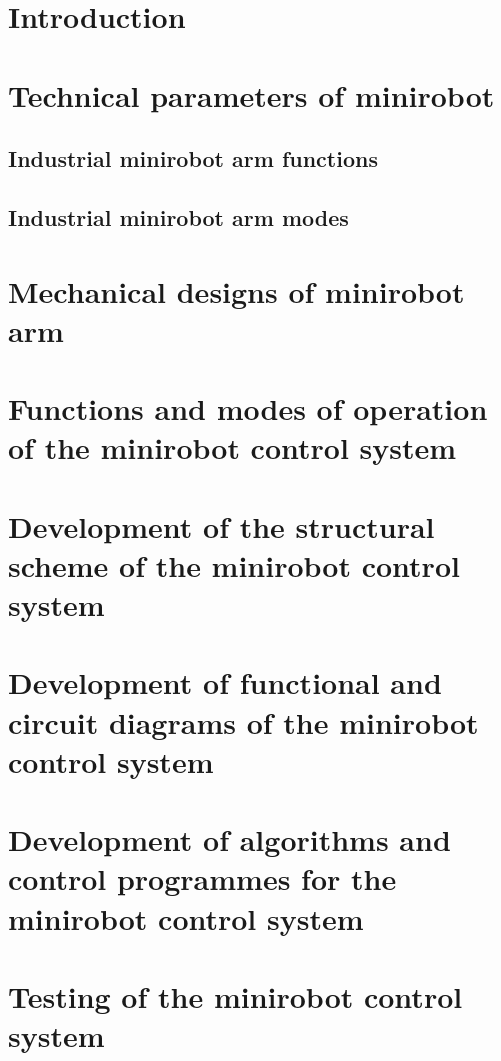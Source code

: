 
\section*{Introduction}



\section{Technical parameters of minirobot}

\subsection{Industrial minirobot arm functions}
\subsection{Industrial minirobot arm modes}


\section{Mechanical designs of minirobot arm}

\section{Functions and modes of operation of the minirobot control system }

\section{Development of the structural scheme of the minirobot control system}

\section{Development of functional and circuit diagrams of the minirobot control system}


\section{Development of algorithms and control programmes for the minirobot control system}


\section{Testing of the minirobot control system }

% 
